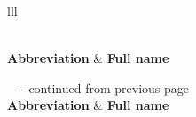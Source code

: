 \begin{center}
\begin{longtable}{lll}
\caption{Explanation of the abbreviated names referring to molecular species
in the main text.}\label{suppl-tab:names} \\
\hline
\noalign{\vskip 2mm} {\bfseries Abbreviation} & {\bfseries Full name} \\[2mm]
\hline
\endfirsthead

%
{\scriptsize{\bfseries \tablename\ \thetable{}} \--\ continued from previous page} \\
\hline
\noalign{\vskip 2mm} {\bfseries Abbreviation} & {\bfseries Full name} \\[2mm]
\hline
\endhead

\hline {} \\ %
\endfoot

\hline
\endlastfoot


\end{longtable}
\end{center}
